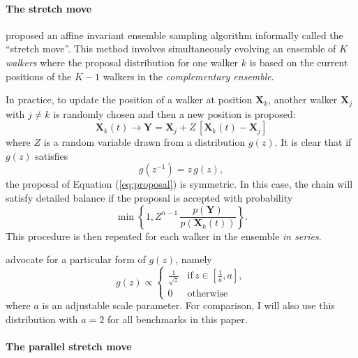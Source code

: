 \documentclass[preprint,12pt]{aastex}
\newcommand{\eqlabel}[1]{\label{eq:#1}}
\newcommand{\eq}[1]{Equation (\ref{eq:#1})}
\begin{document}
\paragraph{The stretch move}

\citet{Goodman:2010} proposed an affine invariant ensemble sampling algorithm
informally called the ``stretch move''. This method involves simultaneously
evolving an ensemble of $K$ \emph{walkers} where the proposal distribution for one
walker $k$ is based on the current positions of the $K-1$ walkers in the
\emph{complementary ensemble}.

In practice, to update the position of a walker at position $\mathbf{X}_k$,
another walker $\mathbf{X}_j$ with $j \ne k$ is randomly chosen and then
a new position is proposed:
\begin{equation}
    \eqlabel{proposal}
    \mathbf{X}_k (t) \rightarrow \mathbf{Y} = \mathbf{X}_j + Z \, [\mathbf{X}_k (t) - \mathbf{X}_j]
\end{equation}
where $Z$ is a random variable drawn from a distribution $g(z)$.  It is clear that
if $g(z)$ satisfies
\begin{equation}
    g(z^{-1}) = z \, g(z),
\end{equation}
the proposal of \eq{proposal} is symmetric. In this case, the chain will satisfy
detailed balance if the proposal is accepted with probability
\begin{equation}
    \min \left \{ 1, Z^{n-1} \, \frac{p(\mathbf{Y})}{p(\mathbf{X}_k(t))} \right \}.
\end{equation}
This procedure is then repeated for each walker in the ensemble \emph{in series}.

\citet{Goodman:2010} advocate for a particular form of $g(z)$, namely
\begin{equation}
    g(z) \propto \left \{ \begin{array}{ll}
        \displaystyle\frac{1}{\sqrt{z}} & \mathrm{if}\, z\in \left [ \displaystyle\frac{1}{a}, a \right ], \\
        0 & \mathrm{otherwise}
    \end{array} \right .
\end{equation}
where $a$ is an adjustable scale parameter. For comparison, I will also use this
distribution with $a=2$ for all benchmarks in this paper.

\paragraph{The parallel stretch move}
\end{document}
